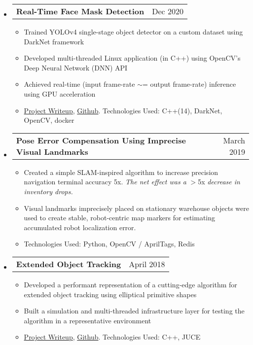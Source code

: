 \documentclass[letterpaper,18pt]{article}
\makeatletter
\newcommand{\resitem}[1]{\item #1 \vspace{-2pt}}
\newcommand{\headerrow}[2]{%
  \hspace*{-\labelsep}%
  \begin{tabular*}{\dimexpr\linewidth+\labelsep}{@{\extracolsep{\fill}}lr@{}}
    #1 &
    #2 \\
  \end{tabular*}%
}
\makeatother
\begin{document}
\begin{itemize}[label={},leftmargin=*,noitemsep]
\item
        \headerrow{\textbf{Real-Time Face Mask Detection}}{Dec 2020}
        {\small
	\begin{itemize}[noitemsep]
        \resitem{Trained YOLOv4 single-stage object detector on a custom dataset using DarkNet framework}
        \resitem{Developed multi-threaded Linux application (in C++) using OpenCV's Deep Neural Network (DNN) API}
        \resitem{Achieved real-time (input frame-rate $\sim$= output frame-rate) inference using GPU acceleration}
        \resitem{\href{https://jwdinius.github.io/projects/mask_detector/}{Project Writeup}, \href{https://github.com/jwdinius/yolov4-mask-detector}{Github}.  Technologies Used: C++(14), DarkNet, OpenCV, docker}
	\end{itemize}
	}
\item
	\headerrow{\textbf{Pose Error Compensation Using Imprecise Visual Landmarks}}{March 2019}
	{\small
	\begin{itemize}[noitemsep]
            \resitem{Created a simple SLAM-inspired algorithm to increase precision navigation terminal accuracy 5x.  \textit{The net effect was a} $>$5x \textit{decrease in inventory drops.}}
		\resitem{Visual landmarks imprecisely placed on stationary warehouse objects were used to create stable, robot-centric map markers for estimating accumulated robot localization error.}
		\resitem{Technologies Used: Python, OpenCV / AprilTags, Redis}
	\end{itemize}
	}
\item
	\headerrow{\textbf{Extended Object Tracking}}{April 2018}
	{\small
	\begin{itemize}[noitemsep]
		\resitem{Developed a performant representation of a cutting-edge algorithm for extended object tracking using elliptical primitive shapes}
		\resitem{Built a simulation and multi-threaded infrastructure layer for testing the algorithm in a representative environment}
		\resitem{\href{https://jwdinius.github.io/projects/eot/}{Project Writeup}, \href{https://github.com/jwdinius/extended-object-tracking}{Github}.  Technologies Used: C++, JUCE}
	\end{itemize}
	}
\end{itemize}

\end{document}

